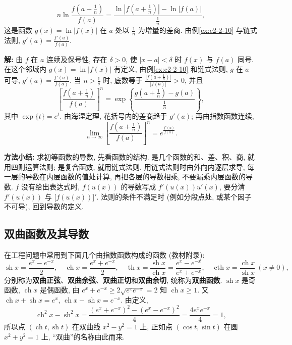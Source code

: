 \documentclass[UTF8,openany]{ctexbook}
\theoremstyle{chinesetextbook}
\newenvironment{cnsolution}{\par\indent\textbf{解:} \ignorespaces}{\par}
\begin{document}
\[
n\ln\frac{f\left(a+\frac1n\right)}{f(a)}=\frac{\ln\left|f\left(a+\frac1n\right)\right|-\ln|f(a)|}{\frac1n},
\]
这是函数 $g(x)=\ln|f(x)|$ 在 $a$ 处以 $\displaystyle\frac1n$ 为增量的差商. 由例\ref{ex:c2-2-10} 与链式法则, $\displaystyle g'(a)=\frac{f'(a)}{f(a)}$.
\begin{cnsolution}
由 $f$ 在 $a$ 连续及保号性, 存在 $\delta>0$, 使 $|x-a|<\delta$ 时 $f(x)$ 与 $f(a)$ 同号. 在这个邻域内 $g(x)=\ln|f(x)|$ 有定义, 由例\ref{ex:c2-2-10} 和链式法则, $g$ 在 $a$ 可导, $\displaystyle g'(a)=\frac{f'(a)}{f(a)}$. 当 $\displaystyle n>\frac1\delta$ 时, 底数等于 $\displaystyle\frac{\left|f\left(a+\frac1n\right)\right|}{|f(a)|}>0$, 并且
\[
\left[\frac{f\left(a+\frac1n\right)}{f(a)}\right]^n=\exp\left\{\frac{g\left(a+\frac1n\right)-g(a)}{\frac1n}\right\},
\]
其中 $\exp\{t\}=e^t$. 由海涅定理, 花括号内的差商趋于 $g'(a)$; 再由指数函数连续,
\[
\lim_{n\to\infty}\left[\frac{f\left(a+\frac1n\right)}{f(a)}\right]^n=e^{\frac{f'(a)}{f(a)}}.
\]
\end{cnsolution}
\par\indent\textbf{方法小结:} 求初等函数的导数, 先看函数的结构. 是几个函数的和、差、积、商, 就用四则运算法则; 是复合函数, 就用链式法则. 用链式法则时由外向内逐层求导, 每一层的导数在内层函数的值处计算, 再把各层的导数相乘, 不要漏乘内层函数的导数. $f$ 没有给出表达式时, $f(u(x))$ 的导数写成 $f'(u(x))u'(x)$, 要分清 $f'(u(x))$ 与 $\bigl[f(u(x))\bigr]'$. 法则的条件不满足时 (例如分段点处, 或某个因子不可导), 回到导数的定义.
\subsection{双曲函数及其导数}
在工程问题中常用到下面几个由指数函数构成的函数 (教材附录):
\[
\operatorname{sh}x=\frac{e^x-e^{-x}}2,\quad\operatorname{ch}x=\frac{e^x+e^{-x}}2,\quad\operatorname{th}x=\frac{\operatorname{sh}x}{\operatorname{ch}x}=\frac{e^x-e^{-x}}{e^x+e^{-x}},\quad\operatorname{cth}x=\frac{\operatorname{ch}x}{\operatorname{sh}x}\ (x\ne0),
\]
分别称为\textbf{双曲正弦}、\textbf{双曲余弦}、\textbf{双曲正切}和\textbf{双曲余切}, 统称为\textbf{双曲函数}. $\operatorname{sh}x$ 是奇函数, $\operatorname{ch}x$ 是偶函数, 由 $e^x+e^{-x}\ge2\sqrt{e^xe^{-x}}=2$ 知 $\operatorname{ch}x\ge1$. 又 $\operatorname{ch}x+\operatorname{sh}x=e^x$, $\operatorname{ch}x-\operatorname{sh}x=e^{-x}$. 由定义,
\[
\operatorname{ch}^2x-\operatorname{sh}^2x=\frac{(e^x+e^{-x})^2-(e^x-e^{-x})^2}4=\frac{4e^xe^{-x}}4=1,
\]
所以点 $(\operatorname{ch}t,\operatorname{sh}t)$ 在双曲线 $x^2-y^2=1$ 上, 正如点 $(\cos t,\sin t)$ 在圆 $x^2+y^2=1$ 上, “双曲”的名称由此而来.
\end{document}

